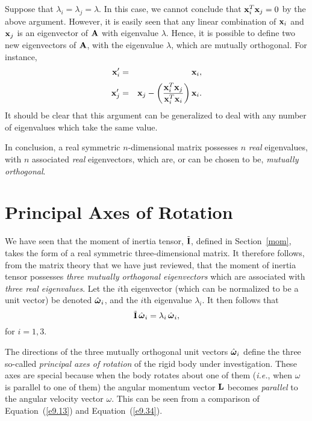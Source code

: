 Suppose that $\lambda_i=\lambda_j=\lambda$. In this case, we cannot conclude
that ${\bf x}_i^T{\bf x}_j = 0$ by the above argument. However, it is easily seen that any
linear combination of ${\bf x}_i$ and ${\bf x}_j$ is an eigenvector
of ${\bf A}$ with eigenvalue $\lambda$. Hence, it is possible
to define two new eigenvectors of ${\bf A}$, with the eigenvalue
$\lambda$, which are mutually orthogonal. For instance,
\begin{eqnarray}
{\bf x}_i' &=& {\bf x}_i,\\[0.5ex]
{\bf x}_j'&=& {\bf x}_j - \left(\frac{{\bf x}_i^T{\bf x}_j}{{\bf x}_i^T{\bf x}_i}\right) {\bf x}_i.
\end{eqnarray}
It should be clear that this argument can be generalized to deal with any
number of eigenvalues which take the same value.

In conclusion, a real symmetric $n$-dimensional matrix
possesses $n$ {\em real}\/ eigenvalues, with $n$ associated {\em real}\/ eigenvectors,
which are, or can be chosen to be, {\em mutually orthogonal}.

\section{Principal Axes of Rotation}
We have seen that the moment of inertia tensor, $\tilde{\bf I}$, defined in Section~\ref{mom}, takes the form of a  real symmetric three-dimensional
matrix. It therefore follows, from the matrix theory that we have just reviewed,
that the moment of inertia tensor possesses {\em three  mutually orthogonal eigenvectors}\/ which are associated with {\em three  real eigenvalues}. Let the $i$th eigenvector (which can be normalized to
be a unit vector) be denoted $\hat{\mbox{\boldmath$\omega$}}_i$, and the $i$th eigenvalue $\lambda_i$. It then
follows that
\begin{equation}\label{e9.34}
\tilde{\bf I}\, \hat{\mbox{\boldmath$\omega$}}_i = \lambda_i\,\hat{\mbox{\boldmath$\omega$}}_i ,
\end{equation}
for $i=1, 3$. 

The directions of the three mutually orthogonal unit vectors $\hat{\mbox{\boldmath$\omega$}}_i $ define the three so-called {\em principal axes
of rotation}\/ of the rigid body under investigation. These axes are special because when the body  rotates about
one of them ({\em i.e.}, when \mbox{\boldmath$\omega$} is parallel to one of them)  the angular momentum vector ${\bf L}$
becomes {\em parallel}\/ to the angular velocity vector \mbox{\boldmath$\omega$}.
This can be seen from a comparison of Equation~(\ref{e9.13}) and Equation~(\ref{e9.34}). 

